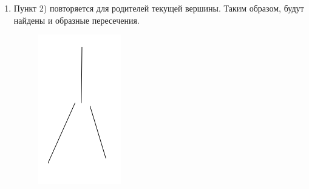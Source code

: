 \begin{enumerate}
\begin{figure}[!h]
\begin{minipage}{0.45\textwidth}
			\caption[X]{}
			\label{fig:xcross}
		\end{minipage}
	\end{figure}
	
	\item Пункт 2) повторяется для родителей текущей вершины. Таким образом, будут найдены  и  образные пересечения.
	\begin{figure}[!h]
		\centering
		\begin{minipage}{0.45\textwidth}
			\centering
			\includegraphics[width=0.7\linewidth]{pictures/Y_cross_revert}
			\caption[Y - обратное]{}
			\label{fig:ycrossrevert}
		\end{minipage}
		\begin{minipage}{0.45\textwidth}
			\centering

\end{minipage}
\end{figure}
\end{enumerate}
